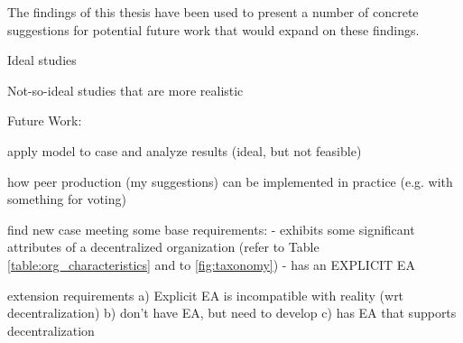 The findings of this thesis have been used to present a number of concrete suggestions for potential future work that would expand on these findings.

Ideal studies

Not-so-ideal studies that are more realistic

Future Work:

apply model to case and analyze results (ideal, but not feasible)

how peer production (my suggestions) can be implemented in practice (e.g. with something for voting)

find new case meeting some base requirements:
 - exhibits some significant attributes of a decentralized organization (refer to Table \ref{table:org_characteristics} and to \ref{fig:taxonomy})
 - has an EXPLICIT EA

extension requirements
 a) Explicit EA is incompatible with reality (wrt decentralization)
 b) don't have EA, but need to develop
 c) has EA that supports decentralization